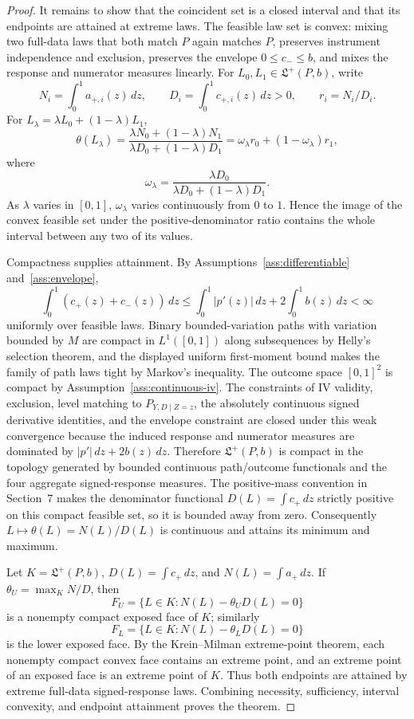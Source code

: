 \documentclass[11pt]{article}
\theoremstyle{definition}
\theoremstyle{plain}
\theoremstyle{remark}
\begin{document}
\begin{proof}
It remains to show that the coincident set is a closed interval and that its
endpoints are attained at extreme laws.  The feasible law set is convex:
mixing two full-data laws that both match \(P\) again matches \(P\), preserves
instrument independence and exclusion, preserves the envelope
\(0\le c_-\le b\), and mixes the response and numerator measures linearly.
For \(L_0,L_1\in\mathfrak L^+(P,b)\), write
\[
N_i=\int_0^1 a_{+,i}(z)\,dz,\qquad
D_i=\int_0^1 c_{+,i}(z)\,dz>0,\qquad
r_i=N_i/D_i .
\]
For \(L_\lambda=\lambda L_0+(1-\lambda)L_1\),
\[
\theta(L_\lambda)=
\frac{\lambda N_0+(1-\lambda)N_1}
     {\lambda D_0+(1-\lambda)D_1}
=
\omega_\lambda r_0+(1-\omega_\lambda)r_1,
\]
where
\[
\omega_\lambda=
\frac{\lambda D_0}{\lambda D_0+(1-\lambda)D_1}.
\]
As \(\lambda\) varies in \([0,1]\), \(\omega_\lambda\) varies continuously
from \(0\) to \(1\).  Hence the image of the convex feasible set under the
positive-denominator ratio contains the whole interval between any two of its
values.

Compactness supplies attainment.  By Assumptions~\ref{ass:differentiable}
and~\ref{ass:envelope},
\[
\int_0^1(c_+(z)+c_-(z))\,dz
\le
\int_0^1 |p'(z)|\,dz+2\int_0^1b(z)\,dz<\infty
\]
uniformly over feasible laws.  Binary bounded-variation paths with variation
bounded by \(M\) are compact in \(L^1([0,1])\) along subsequences by Helly's
selection theorem, and the displayed uniform first-moment bound makes the
family of path laws tight by Markov's inequality.  The outcome space
\([0,1]^2\) is compact by Assumption~\ref{ass:continuous-iv}.  The constraints
of IV validity, exclusion, level matching to \(P_{Y,D\mid Z=z}\), the
absolutely continuous signed derivative identities, and the envelope
constraint are closed under this weak convergence because the induced response
and numerator measures are dominated by
\(|p'|\,dz+2b(z)\,dz\).  Therefore \(\mathfrak L^+(P,b)\) is compact in the
topology generated by bounded continuous path/outcome functionals and the
four aggregate signed-response measures.  The positive-mass convention in
Section~7 makes the denominator functional \(D(L)=\int c_+\,dz\) strictly
positive on this compact feasible set, so it is bounded away from zero.
Consequently \(L\mapsto \theta(L)=N(L)/D(L)\) is continuous and attains its
minimum and maximum.

Let \(K=\mathfrak L^+(P,b)\), \(D(L)=\int c_+\,dz\), and
\(N(L)=\int a_+\,dz\).  If \(\theta_U=\max_K N/D\), then
\[
F_U=\{L\in K:N(L)-\theta_U D(L)=0\}
\]
is a nonempty compact exposed face of \(K\); similarly
\[
F_L=\{L\in K:N(L)-\theta_L D(L)=0\}
\]
is the lower exposed face.  By the Krein--Milman extreme-point theorem, each
nonempty compact convex face contains an extreme point, and an extreme point
of an exposed face is an extreme point of \(K\).  Thus both endpoints are
attained by extreme full-data signed-response laws.  Combining necessity,
sufficiency, interval convexity, and endpoint attainment proves the theorem.
\end{proof}
\end{document}
